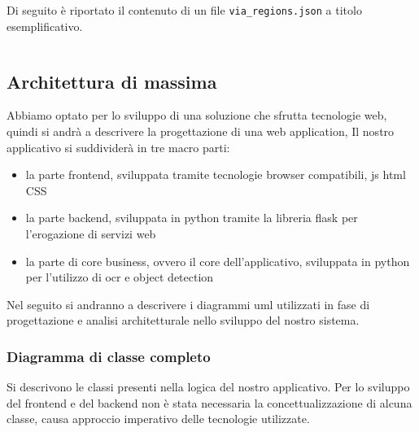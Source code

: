 \documentclass[12pt,a4paper]{article}
\begin{document}

Di seguito è riportato il contenuto di un file
\texttt{via\_regions.json} a titolo esemplificativo.

\inputminted{json}{via_regions.json}

\subsection{Architettura di massima}

Abbiamo optato per lo sviluppo di una soluzione che sfrutta tecnologie
web, quindi si andrà a descrivere la progettazione di una web application, Il nostro
applicativo si suddividerà in tre macro parti:

\begin{itemize}
    \item la parte frontend, sviluppata tramite tecnologie browser
        compatibili, js html CSS
    \item la parte backend, sviluppata in python tramite la libreria
        flask per l'erogazione di servizi web
    \item la parte di core business, ovvero il core dell'applicativo,
        sviluppata in python per l'utilizzo di ocr e object
        detection
\end{itemize}

Nel seguito si andranno a descrivere i diagrammi uml utilizzati in fase
di progettazione e analisi architetturale nello sviluppo del nostro
sistema.


\subsubsection{Diagramma di classe completo}

Si descrivono le classi presenti nella logica del nostro applicativo.
Per lo sviluppo del frontend e del backend non è stata necessaria la
concettualizzazione di alcuna classe, causa approccio imperativo delle
tecnologie utilizzate.
\end{document}
